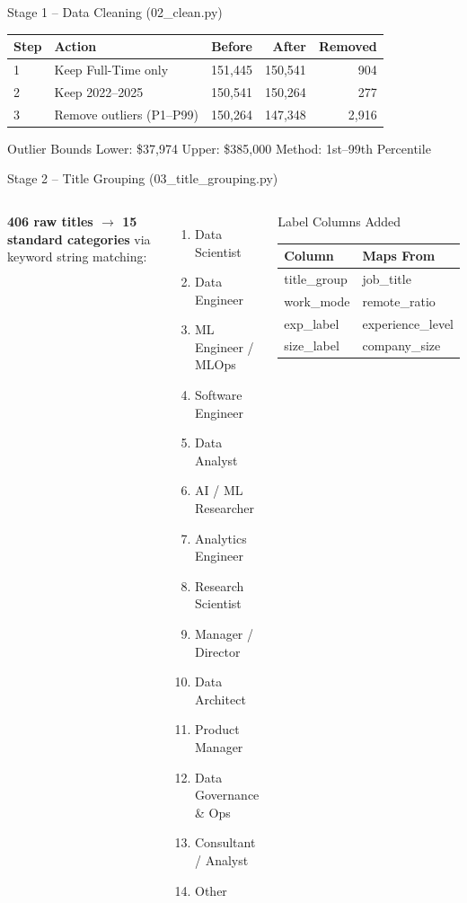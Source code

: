 \documentclass[aspectratio=169]{beamer}
\begin{document}
\begin{frame}{Stage 1 -- Data Cleaning (02\_clean.py)}
\begin{table}
\centering
\begin{tabular}{llrrr}
\toprule
\textbf{Step} & \textbf{Action} & \textbf{Before} & \textbf{After} & \textbf{Removed} \\
\midrule
1 & Keep Full-Time only & 151,445 & 150,541 & 904 \\
2 & Keep 2022--2025 & 150,541 & 150,264 & 277 \\
3 & Remove outliers (P1--P99) & 150,264 & 147,348 & 2,916 \\
\bottomrule
\end{tabular}
\end{table}
\vspace{0.3cm}
\begin{block}{Outlier Bounds}
Lower: \$37,974 \hfill Upper: \$385,000 \hfill Method: 1st--99th Percentile
\end{block}
\end{frame}

\begin{frame}{Stage 2 -- Title Grouping (03\_title\_grouping.py)}
\begin{columns}
\footnotesize
\textbf{406 raw titles $\rightarrow$ 15 standard categories} via keyword string matching:
\begin{enumerate}\footnotesize
    \item Data Scientist
    \item Data Engineer
    \item ML Engineer / MLOps
    \item Software Engineer
    \item Data Analyst
    \item AI / ML Researcher
    \item Analytics Engineer
    \item Research Scientist
    \item Manager / Director
    \item Data Architect
    \item Product Manager
    \item Data Governance \& Ops
    \item Consultant / Analyst
    \item Other
\end{enumerate}
\begin{block}{Label Columns Added}
\footnotesize
\begin{tabular}{ll}
\toprule
\textbf{Column} & \textbf{Maps From} \\
\midrule
title\_group & job\_title \\
work\_mode & remote\_ratio \\
exp\_label & experience\_level \\
size\_label & company\_size \\
\bottomrule
\end{tabular}
\end{block}
\end{columns}
\end{frame}
\end{document}
